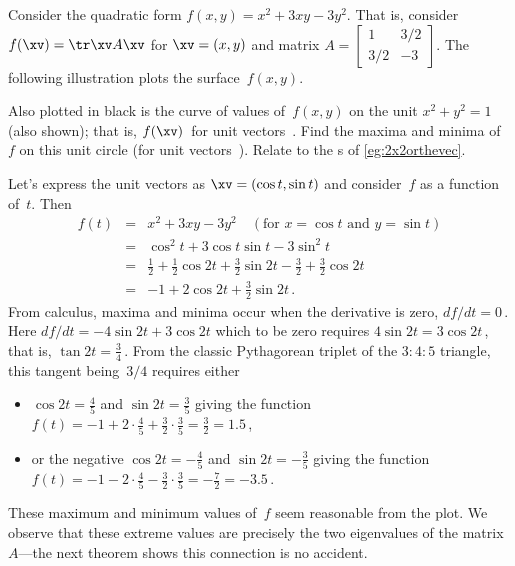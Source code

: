 \begin{example} \label{eg:}
Consider the quadratic form \(f(x,y)=x^2+3xy-3y^2\). 
That is, consider \(f(\xv)=\tr\xv A\xv\) for \(\xv=(x,y)\) and matrix \(A=\begin{bmatrix} 1&3/2\\3/2&-3 \end{bmatrix}\).
The following illustration plots the surface~\(f(x,y)\).
\begin{center}
\end{center}
Also plotted in black is the curve of values of~\(f(x,y)\) on the unit  \(x^2+y^2=1\) (also shown); that is, \(f(\xv)\)~for unit vectors~\xv.
Find the maxima and minima of~\(f\) on this unit circle (for unit vectors~\xv).
Relate to the s of \autoref{eg:2x2orthevec}.
\begin{solution} 
Let's express the unit vectors as \(\xv=(\cos t,\sin t)\) and consider~\(f\) as a function of~\(t\).
Then 
\begin{eqnarray*}
f(t)&=&x^2+3xy-3y^2\quad(\text{for }x=\cos t\text{ and }y=\sin t)
\\&=&\cos^2t+3\cos t\sin t-3\sin^2t
\\&=&\tfrac12+\tfrac12\cos2t+\tfrac32\sin2t -\tfrac32+\tfrac32\cos2t
\\&=&-1+2\cos2t+\tfrac32\sin2t\,.
\end{eqnarray*}
From calculus, maxima and minima occur when the derivative is zero, \(df/dt=0\)\,.
Here \(df/dt=-4\sin2t+3\cos2t\) which to be zero requires \(4\sin2t=3\cos2t\)\,, that is, \(\tan2t=\tfrac34\)\,.
From the classic Pythagorean triplet of the \(3:4:5\) triangle, this tangent being~\(3/4\) requires either \begin{itemize}
\item \(\cos2t=\tfrac45\) and \(\sin2t=\tfrac35\) giving the function \(f(t)=-1+2\cdot\tfrac45+\tfrac32\cdot\tfrac35
=\tfrac32=1.5\)\,,
\item or the negative \(\cos2t=-\tfrac45\) and \(\sin2t=-\tfrac35\) giving the function \(f(t)=-1-2\cdot\tfrac45-\tfrac32\cdot\tfrac35
=-\tfrac72=-3.5\)\,.
\end{itemize}
These maximum and minimum values of~\(f\) seem reasonable from the plot.
We observe that these extreme values are precisely the two eigenvalues of the matrix~\(A\)---the next theorem shows this connection is no accident.
\end{solution}
\end{example}






